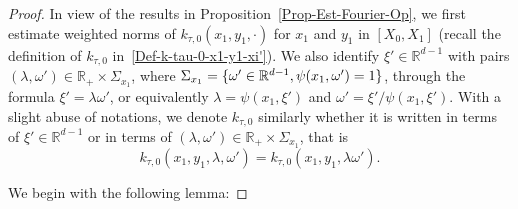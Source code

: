 \documentclass[AHL,Unicode,longabstracts]{cedram}
\newcommand*\R{\mathbb{R}}
\begin{document}
\begin{proof}
In view of the results in Proposition~\ref{Prop-Est-Fourier-Op}, we first estimate weighted norms of $k_{\tau,0}(x_1, y_1, \cdot)$ for $x_1$ and $y_1$ in $[X_0,X_1]$ (recall the definition of $k_{\tau,0}$ in~\eqref{Def-k-tau-0-x1-y1-xi'}). We also identify $\xi' \in \R^{d-1}$ with pairs $(\lambda, \omega') \in \R_+ \times \Sigma_{x_1}$, where $\Sigma_{x_1} = \{ \omega' \in \R^{d-1}, \psi(x_1, \omega')\linebreak = 1\}$, through the formula $\xi' = \lambda \omega'$, or equivalently $\lambda = \psi(x_1,\xi')$ and $\omega' = \xi' /\psi(x_1,\xi')$. With a slight abuse of notations, we denote $k_{\tau,0}$ similarly whether it is written in terms of $\xi' \in \R^{d-1}$ or in terms of $(\lambda, \omega') \in \R_+ \times \Sigma_{x_1}$, that is
\[
k_{\tau,0}(x_1, y_1, \lambda, \omega') = k_{\tau,0}(x_1, y_1, \lambda \omega').
\]

We begin with the following lemma:


\end{proof}
\end{document}
